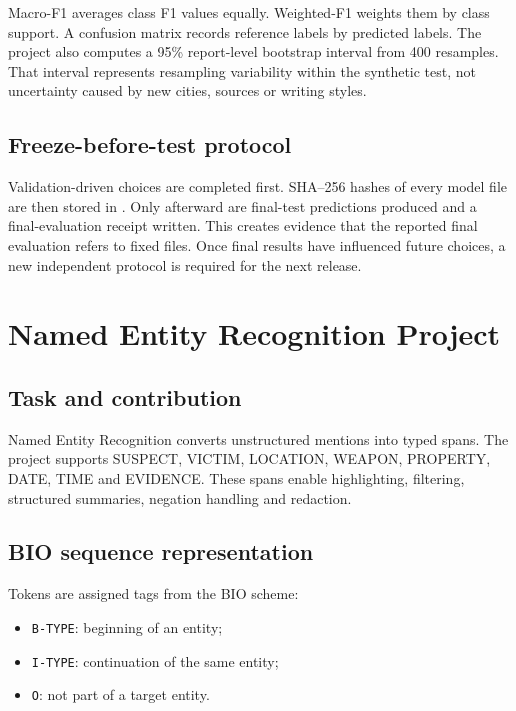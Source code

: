 \documentclass[12pt,a4paper]{report}
\newcommand{\code}[1]{\texttt{#1}}
\begin{document}
Macro-F1 averages class F1 values equally. Weighted-F1 weights them by class support. A confusion matrix records reference labels by predicted labels. The project also computes a 95\% report-level bootstrap interval from 400 resamples. That interval represents resampling variability within the synthetic test, not uncertainty caused by new cities, sources or writing styles.

\section{Freeze-before-test protocol}

Validation-driven choices are completed first. SHA--256 hashes of every model file are then stored in . Only afterward are final-test predictions produced and a final-evaluation receipt written. This creates evidence that the reported final evaluation refers to fixed files. Once final results have influenced future choices, a new independent protocol is required for the next release.

\chapter{Named Entity Recognition Project}

\section{Task and contribution}

Named Entity Recognition converts unstructured mentions into typed spans. The project supports SUSPECT, VICTIM, LOCATION, WEAPON, PROPERTY, DATE, TIME and EVIDENCE. These spans enable highlighting, filtering, structured summaries, negation handling and redaction.

\section{BIO sequence representation}

Tokens are assigned tags from the BIO scheme:

\begin{itemize}
  \item \code{B-TYPE}: beginning of an entity;
  \item \code{I-TYPE}: continuation of the same entity;
  \item \code{O}: not part of a target entity.
\end{itemize}
\end{document}
